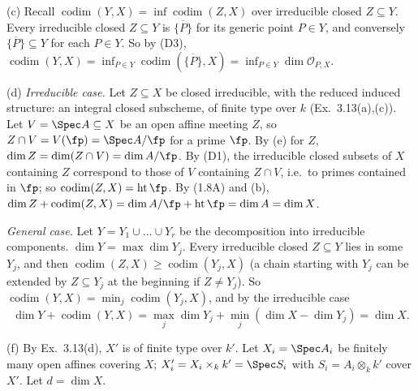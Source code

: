 \documentclass[11pt]{article}
\begin{document}
(c) Recall $\operatorname{codim}(Y,X)=\inf\operatorname{codim}(Z,X)$ over irreducible closed $Z\subseteq Y$. Every irreducible closed $Z\subseteq Y$ is $\overline{\{P\}}$ for its generic point $P\in Y$, and conversely $\overline{\{P\}}\subseteq Y$ for each $P\in Y$. So by (D3), $\operatorname{codim}(Y,X)=\inf_{P\in Y}\operatorname{codim}(\overline{\{P\}},X)=\inf_{P\in Y}\dim\mathcal O_{P,X}$.

(d) \emph{Irreducible case.} Let $Z\subseteq X$ be closed irreducible, with the reduced induced structure: an integral closed subscheme, of finite type over $k$ (Ex.~3.13(a),(c)). Let $V=\Spec A\subseteq X$ be an open affine meeting $Z$, so $Z\cap V=V(\fp)=\Spec A/\fp$ for a prime $\fp$. By (e) for $Z$, $\dim Z=\dim(Z\cap V)=\dim A/\fp$. By (D1), the irreducible closed subsets of $X$ containing $Z$ correspond to those of $V$ containing $Z\cap V$, i.e.\ to primes contained in $\fp$; so $\operatorname{codim}(Z,X)=\operatorname{ht}\fp$. By (1.8A) and (b), $\dim Z+\operatorname{codim}(Z,X)=\dim A/\fp+\operatorname{ht}\fp=\dim A=\dim X$.

\emph{General case.} Let $Y=Y_1\cup\dots\cup Y_r$ be the decomposition into irreducible components. $\dim Y=\max\dim Y_j$. Every irreducible closed $Z\subseteq Y$ lies in some $Y_j$, and then $\operatorname{codim}(Z,X)\ge\operatorname{codim}(Y_j,X)$ (a chain starting with $Y_j$ can be extended by $Z\subseteq Y_j$ at the beginning if $Z\ne Y_j$). So $\operatorname{codim}(Y,X)=\min_j\operatorname{codim}(Y_j,X)$, and by the irreducible case
\[\dim Y+\operatorname{codim}(Y,X)=\max_j\dim Y_j+\min_j(\dim X-\dim Y_j)=\dim X.\]

(f) By Ex.~3.13(d), $X'$ is of finite type over $k'$. Let $X_i=\Spec A_i$ be finitely many open affines covering $X$; $X_i'=X_i\times_kk'=\Spec S_i$ with $S_i=A_i\otimes_kk'$ cover $X'$. Let $d=\dim X$.
\end{document}
